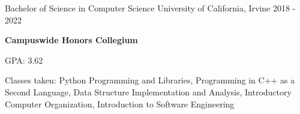
\begin{cventries}
  \cventry
    {Bachelor of Science in Computer Science} %
    {University of California, Irvine} %
    {} %
    {2018 - 2022} %
    {
      \begin {cvitems}
        \item{\textbf{Campuswide Honors Collegium}}
        \item {GPA: 3.62}
        \item{Classes taken: Python Programming and Libraries, Programming in C++ as a Second Language, Data Structure Implementation and Analysis, \newline
        Introductory Computer Organization, Introduction to Software Engineering}
      \end{cvitems}
    }
\end{cventries}
